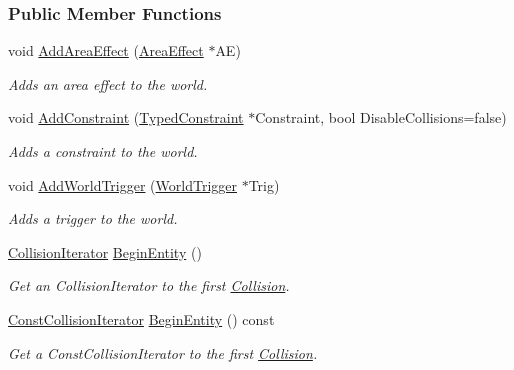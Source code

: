 \subsubsection*{Public Member Functions}
\begin{DoxyCompactItemize}
\item 
void \hyperlink{classMezzanine_1_1PhysicsManager_a62c7bb223d2712a4f1806216429015a9}{AddAreaEffect} (\hyperlink{classMezzanine_1_1AreaEffect}{AreaEffect} $\ast$AE)
\begin{DoxyCompactList}\small\item\em Adds an area effect to the world. \item\end{DoxyCompactList}\item 
void \hyperlink{classMezzanine_1_1PhysicsManager_ae07ea8ae4877fcc3d0757e42d2726b65}{AddConstraint} (\hyperlink{classMezzanine_1_1TypedConstraint}{TypedConstraint} $\ast$Constraint, bool DisableCollisions=false)
\begin{DoxyCompactList}\small\item\em Adds a constraint to the world. \item\end{DoxyCompactList}\item 
void \hyperlink{classMezzanine_1_1PhysicsManager_a4dfbe87e03c09b1fcce946c9b9271fa6}{AddWorldTrigger} (\hyperlink{classMezzanine_1_1WorldTrigger}{WorldTrigger} $\ast$Trig)
\begin{DoxyCompactList}\small\item\em Adds a trigger to the world. \item\end{DoxyCompactList}\item 
\hyperlink{classMezzanine_1_1PhysicsManager_a930a032df1bf01b9f93ba4e815a433c2}{CollisionIterator} \hyperlink{classMezzanine_1_1PhysicsManager_a6633a616c8ff9739ec16d028d7ab5d27}{BeginEntity} ()
\begin{DoxyCompactList}\small\item\em Get an CollisionIterator to the first \hyperlink{classMezzanine_1_1Collision}{Collision}. \item\end{DoxyCompactList}\item 
\hyperlink{classMezzanine_1_1PhysicsManager_a62c722b08b8fa0f015fe2b375c452dde}{ConstCollisionIterator} \hyperlink{classMezzanine_1_1PhysicsManager_af38a7946fe715ce9aee66cff478c4619}{BeginEntity} () const 
\begin{DoxyCompactList}\small\item\em Get a ConstCollisionIterator to the first \hyperlink{classMezzanine_1_1Collision}{Collision}. \item\end{DoxyCompactList}\item 

\end{DoxyCompactItemize}
